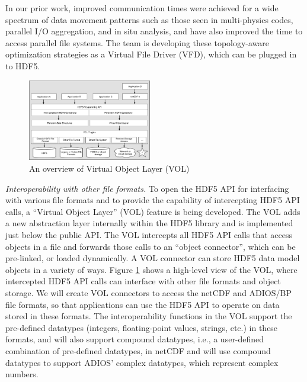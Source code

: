 In our prior work, improved communication times were achieved for a wide spectrum of data movement patterns such as those seen in multi-physics codes, parallel I/O aggregation, and in situ analysis, and have also improved the time to access parallel file systems. The team is developing these topology-aware optimization strategies as a Virtual File Driver (VFD), which can be plugged in to HDF5. 

\begin{figure}
  \begin{center}
    \includegraphics[width=0.48\textwidth]{projects/2.3.4-DataViz/2.3.4.15-HDF5-UnifyCR/VOL-Overview.pdf}
  \end{center}
  \caption{An overview of Virtual Object Layer (VOL)}
  \label{fig:vol-overview}
\end{figure}

\textit{Interoperability with other file formats.} To open the HDF5 API for interfacing with various file formats and to provide the capability of intercepting HDF5 API calls, a ``Virtual Object Layer'' (VOL) feature is being developed. The VOL adds a new abstraction layer internally within the HDF5 library and is implemented just below the public API. The VOL intercepts all HDF5 API calls that access objects in a file and forwards those calls to an “object connector”, which can be pre-linked, or loaded dynamically. A VOL connector can store HDF5 data model objects in a variety of ways. Figure \ref{fig:vol-overview} shows a high-level view of the VOL, where intercepted HDF5 API calls can interface with other file formats and object storage. We will create VOL connectors to access the netCDF and ADIOS/BP file formats, so that applications can use the HDF5 API to operate on data stored in these formats. The interoperability functions in the VOL support the pre-defined datatypes (integers, floating-point values, strings, etc.) in these formats, and will also support compound datatypes, i.e., a user-defined combination of pre-defined datatypes, in netCDF and will use compound datatypes to support ADIOS’ complex datatypes, which represent complex numbers.



